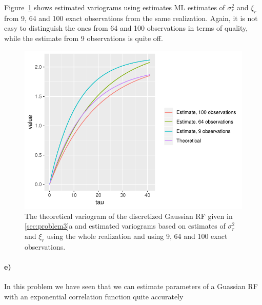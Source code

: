 Figure~\ref{fig:3d_variogram_estimatess} shows estimated variograms using estimates ML estimates of $\sigma_r^2$ and $\xi_r$ from 9, 64 and 100 exact observations from the same realization. Again, it is not easy to distinguish the ones from 64 and 100 observations in terms of quality, while the estimate from 9 observations is quite off.

\begin{figure}
    \centering
    \includegraphics[scale=0.95]{figures/3d_variogram_estimatess.pdf}
    \caption{The theoretical variogram of the discretized Gaussian RF given in \ref{sec:problem3}a and estimated variograms based on estimates of $\sigma_r^2$ and $\xi_r$ using the whole realization and using 9, 64 and 100 exact observations.}
    \label{fig:3d_variogram_estimatess}
\end{figure}

\paragraph{e)}
In this problem we have seen that we can estimate parameters of a Guassian RF with an exponential correlation function quite accurately
